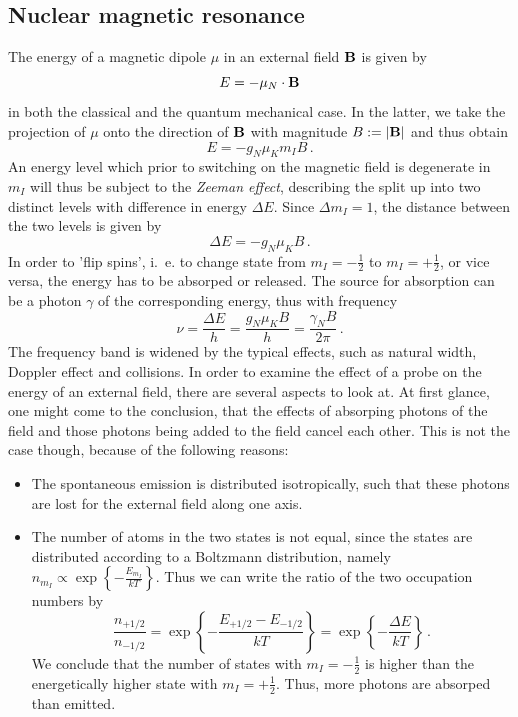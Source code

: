 \subsection{Nuclear magnetic resonance}
The energy of a magnetic dipole $\mu$ in an external field $\mathbf{B}$ is given by 
\begin{equation}
    E = - \mu_N \cdot \mathbf{B}
\end{equation}
in both the classical and the quantum mechanical case. In the latter, 
we take the projection of $\mu$ onto the direction of $\mathbf{B}$ with magnitude 
$B := |\mathbf{B}|$ and thus obtain 
\begin{equation}
    E = - g_N \mu_K m_I B \, .
\end{equation}
An energy level which prior to switching on the magnetic field is degenerate in $m_I$ 
will thus be subject to the \emph{Zeeman effect}, describing the split up into two 
distinct levels with difference in energy $\Delta E$. Since $\Delta m_I = 1$, the 
distance between the two levels is given by 
\begin{equation}
    \Delta E = - g_N \mu_K B \, .
\end{equation}
In order to 'flip spins', i.~e. to change state from $m_I = - \frac{1}{2}$ to $m_I = + \frac{1}{2}$, 
or vice versa, the energy has to be absorped or released. The source for absorption can be a photon $\gamma$
of the corresponding energy, thus with frequency 
\begin{equation}
    \nu = \frac{\Delta E}{h} = \frac{g_N \mu_K B}{h} = \frac{\gamma_N B}{2 \pi}\, .
    \label{eq:nu}
\end{equation}
The frequency band is widened by the typical effects, such as natural width, Doppler effect 
and collisions. 
In order to examine the effect of a probe on the energy of an external field, there are several
aspects to look at. At first glance, one might come to the conclusion, that the effects of 
absorping photons of the field and those photons being added to the field cancel each other. 
This is not the case though, because of the following reasons:
\begin{itemize}
    \item
        The spontaneous emission is distributed isotropically, such that these photons are lost for 
        the external field along one axis.
    \item
        The number of atoms in the two states is not equal, since the states are distributed according to 
        a Boltzmann distribution, namely $n_{m_I} \propto \exp\left\{-\frac{E_{m_I}}{kT}\right\}$. 
        Thus we can write the ratio of the two occupation numbers by
        \begin{equation}
            \frac{n_{+1/2}}{n_{-1/2}} 
                = \exp\left\{-\frac{E_{+1/2} - E_{-1/2}}{kT} \right\}
                = \exp\left\{-\frac{\Delta E}{kT} \right\} \, .
        \end{equation}
        We conclude that the number of states with $m_I = -\frac{1}{2}$ is higher than the energetically 
        higher state with $m_I = +\frac{1}{2}$. Thus, more photons are absorped than emitted. 
\end{itemize}

